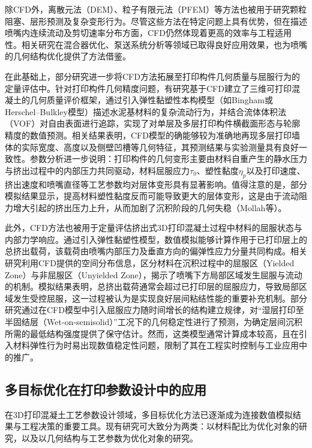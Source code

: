 除CFD外，离散元法（DEM）、粒子有限元法（PFEM）等方法也被用于研究颗粒阻塞、层形预测及复杂变形行为\cite{ramyar2022,remond2014,chang2022,elcheikh2017,reinold2022}。尽管这些方法在特定问题上具有优势，但在描述喷嘴内连续流动及剪切速率分布方面，CFD仍然体现着更高的效率与工程适用性。相关研究在混合器优化、泵送系统分析等领域已取得良好应用效果，也为喷嘴的几何结构优化提供了方法借鉴\cite{hanada2016,jiang2022}。

在此基础上，部分研究进一步将CFD方法拓展至打印构件几何质量与屈服行为的定量评估中。针对打印构件几何精度问题，有研究基于CFD建立了三维可打印混凝土的几何质量评价框架，通过引入弹性黏塑性本构模型（如Bingham或Herschel--Bulkley模型）描述水泥基材料的复杂流动行为，并结合流体体积法（VOF）对自由表面进行追踪，实现了对单层及多层打印构件横截面形态与轮廓精度的数值预测\cite{dinkgreve2016,suiker2018,spangenberg2021,vantyghem2021}。相关结果表明，CFD模型的确能够较为准确地再现多层打印墙体的实际宽度、高度以及侧壁凹槽等几何特征，其预测结果与实验测量具有良好一致性。参数分析进一步说明：打印构件的几何变形主要由材料自重产生的静水压力与挤出过程中的内部压力共同驱动，材料屈服应力$\tau_0$、塑性黏度$\eta_p$以及打印速度、挤出速度和喷嘴直径等工艺参数均对层体变形具有显著影响。值得注意的是，部分模拟结果显示，提高材料塑性黏度反而可能导致更大的层体变形，这是由于流动阻力增大引起的挤出压力上升，从而加剧了沉积阶段的几何失稳（Mollah等\cite{mollah2021,mollah2023}）。

此外，CFD方法也被用于定量评估挤出式3D打印混凝土过程中材料的屈服状态与内部力学响应。通过引入弹性黏塑性模型，数值模拟能够计算作用于已打印层上的总挤出载荷，该载荷由喷嘴内部压力及垂直方向的偏弹性应力分量共同构成。相关研究利用CFD提供的空间分布信息，区分材料在沉积过程中的屈服区（Yielded Zone）与非屈服区（Unyielded Zone），揭示了喷嘴下方局部区域发生屈服与流动的机制。模拟结果表明，总挤出载荷通常会超过已打印层的屈服应力，导致局部区域发生受控屈服，这一过程被认为是实现良好层间粘结性能的重要补充机制\cite{spangenberg2021}。部分研究通过在CFD模型中引入屈服应力随时间增长的结构建立规律，对``湿层打印至半固结层（Wet-on-semisolid）''工况下的几何稳定性进行了预测，为确定层间沉积所需的最低结构强度提供了保守估计。然而，这类模型通常计算成本较高，且在引入材料弹性行为时易出现数值稳定性问题，限制了其在工程实时控制与工业应用中的推广\cite{spangenberg2021,mollah2021,mollah2023}。

\subsection{多目标优化在打印参数设计中的应用}

在3D打印混凝土工艺参数设计领域，多目标优化方法已逐渐成为连接数值模拟结果与工程决策的重要工具。现有研究可大致分为两类：以材料配比为优化对象的研究，以及以几何结构与工艺参数为优化对象的研究。

